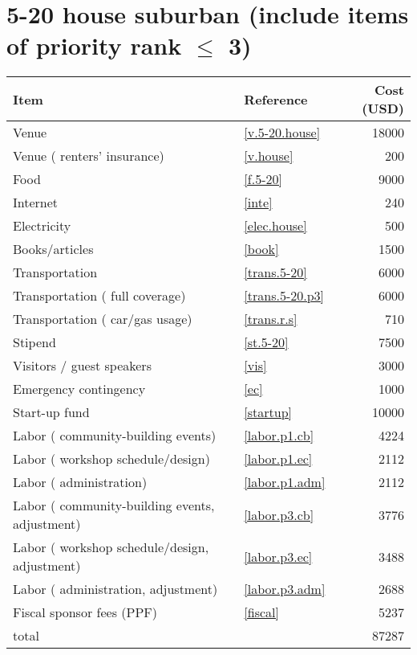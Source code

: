 \section*{5-20 house suburban (include items of priority rank $\leq$ 3)}
\begin{center}
\begin{tabular}{llr}
Item & Reference & Cost (USD) \\ \hline
Venue & \ref{v.5-20.house} & 18000 \\
Venue ( renters' insurance) & \ref{v.house} & 200 \\
Food & \ref{f.5-20} & 9000 \\
Internet & \ref{inte} & 240 \\
Electricity & \ref{elec.house} & 500 \\
Books/articles & \ref{book} & 1500 \\
Transportation & \ref{trans.5-20} & 6000 \\
Transportation ( full coverage) & \ref{trans.5-20.p3} & 6000 \\
Transportation ( car/gas usage) & \ref{trans.r.s} & 710 \\
Stipend & \ref{st.5-20} & 7500 \\
Visitors / guest speakers & \ref{vis} & 3000 \\
Emergency contingency & \ref{ec} & 1000 \\
Start-up fund & \ref{startup} & 10000 \\
Labor ( community-building events) & \ref{labor.p1.cb} & 4224 \\
Labor ( workshop schedule/design) & \ref{labor.p1.ec} & 2112 \\
Labor ( administration) & \ref{labor.p1.adm} & 2112 \\
Labor ( community-building events, adjustment) & \ref{labor.p3.cb} & 3776 \\
Labor ( workshop schedule/design, adjustment) & \ref{labor.p3.ec} & 3488 \\
Labor ( administration, adjustment) & \ref{labor.p3.adm} & 2688 \\
Fiscal sponsor fees (PPF) & \ref{fiscal} & 5237 \\ \hline
total &  & 87287
\end{tabular}
\end{center}
\newpage
